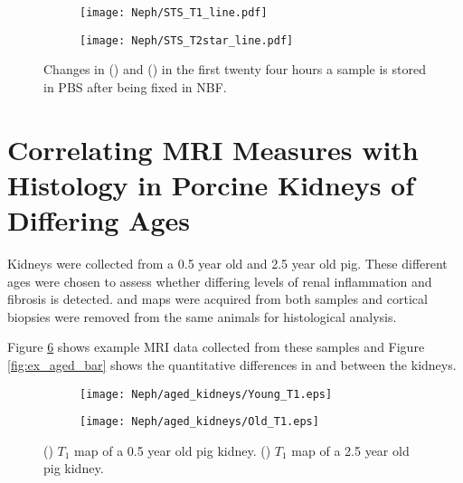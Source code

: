 \begin{figure}[H]
	\centering
	\begin{subfigure}[c]{0.47\textwidth}
		\centering
		\texttt{[image: Neph/STS\_T1\_line.pdf]}
		\caption{}
		\label{fig:ex_fixation_t1_3t_sts}
	\end{subfigure}
	\hfill
	\begin{subfigure}[c]{0.47\textwidth}
		\centering
		\texttt{[image: Neph/STS\_T2star\_line.pdf]}
		\caption{}
		\label{fig:ex_fixation_t2star_3t_sts}
	\end{subfigure}
	\caption{Changes in \tone () and \ttwostar () in the first twenty four hours a sample is stored in \ac{PBS} after being fixed in \ac{NBF}.}
	\label{fig:ex_fixation_sts}
\end{figure}

\section{Correlating MRI Measures with Histology in Porcine Kidneys of Differing Ages}
\label{sec:ex_ages}
Kidneys were collected from a 0.5 year old and 2.5 year old pig. These different ages were chosen to assess whether differing levels of renal inflammation and fibrosis is detected. \tone and \ttwostar maps were acquired from both samples and cortical biopsies were removed from the same animals for histological analysis. 

Figure \ref{fig:ex_aged_map} shows example \ac{MRI} data collected from these samples and Figure \ref{fig:ex_aged_bar} shows the quantitative differences in \tone and \ttwo between the kidneys. 

\begin{figure}[H]
	\centering
	\begin{subfigure}[c]{0.47\textwidth}
		\centering
		\texttt{[image: Neph/aged\_kidneys/Young\_T1.eps]}
		\caption{}
		\label{fig:ex_aged_t1_map}
	\end{subfigure}
	\hfill
	\begin{subfigure}[c]{0.47\textwidth}
		\centering
		\texttt{[image: Neph/aged\_kidneys/Old\_T1.eps]}
		\caption{}
		\label{fig:ex_aged_t2star_map}
	\end{subfigure}
	\caption{() $T_1$ map of a 0.5 year old pig kidney. () $T_1$ map of a 2.5 year old pig kidney.}
	\label{fig:ex_aged_map}
\end{figure}

